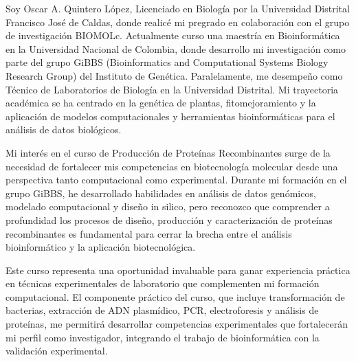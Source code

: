 \documentclass[11pt, letterpaper]{awesome-cv} %
\begin{document}
\makecvheader %

\makelettertitle %


\begin{cvletter}



Soy Oscar A. Quintero López, Licenciado en Biología por la Universidad Distrital Francisco José de Caldas, donde realicé mi pregrado en colaboración con el grupo de investigación BIOMOLc. Actualmente curso una maestría en Bioinformática en la Universidad Nacional de Colombia, donde desarrollo mi investigación como parte del grupo GiBBS (Bioinformatics and Computational Systems Biology Research Group) del Instituto de Genética. Paralelamente, me desempeño como Técnico de Laboratorios de Biología en la Universidad Distrital. Mi trayectoria académica se ha centrado en la genética de plantas, fitomejoramiento y la aplicación de modelos computacionales y herramientas bioinformáticas para el análisis de datos biológicos.



Mi interés en el curso de Producción de Proteínas Recombinantes surge de la necesidad de fortalecer mis competencias en biotecnología molecular desde una perspectiva tanto computacional como experimental. Durante mi formación en el grupo GiBBS, he desarrollado habilidades en análisis de datos genómicos, modelado computacional y diseño in silico, pero reconozco que comprender a profundidad los procesos de diseño, producción y caracterización de proteínas recombinantes es fundamental para cerrar la brecha entre el análisis bioinformático y la aplicación biotecnológica.

Este curso representa una oportunidad invaluable para ganar experiencia práctica en técnicas experimentales de laboratorio que complementen mi formación computacional. El componente práctico del curso, que incluye transformación de bacterias, extracción de ADN plasmídico, PCR, electroforesis y análisis de proteínas, me permitirá desarrollar competencias experimentales que fortalecerán mi perfil como investigador, integrando el trabajo de bioinformática con la validación experimental.


\end{cvletter}
\end{document}
